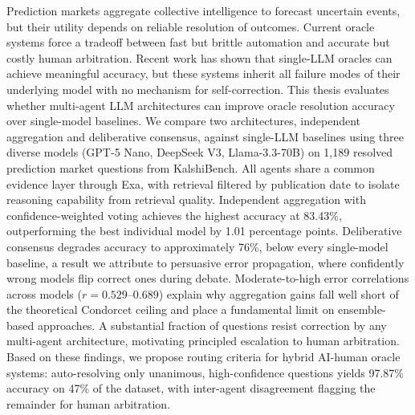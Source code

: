 \thispagestyle{plain}

Prediction markets aggregate collective intelligence to forecast uncertain events, but their utility depends on reliable resolution of outcomes. Current oracle systems force a tradeoff between fast but brittle automation and accurate but costly human arbitration. Recent work has shown that single-LLM oracles can achieve meaningful accuracy, but these systems inherit all failure modes of their underlying model with no mechanism for self-correction. This thesis evaluates whether multi-agent LLM architectures can improve oracle resolution accuracy over single-model baselines. We compare two architectures, independent aggregation and deliberative consensus, against single-LLM baselines using three diverse models (GPT-5 Nano, DeepSeek V3, Llama-3.3-70B) on 1,189 resolved prediction market questions from KalshiBench. All agents share a common evidence layer through Exa, with retrieval filtered by publication date to isolate reasoning capability from retrieval quality. Independent aggregation with confidence-weighted voting achieves the highest accuracy at 83.43\%, outperforming the best individual model by 1.01 percentage points. Deliberative consensus degrades accuracy to approximately 76\%, below every single-model baseline, a result we attribute to persuasive error propagation, where confidently wrong models flip correct ones during debate. Moderate-to-high error correlations across models ($r = 0.529$--$0.689$) explain why aggregation gains fall well short of the theoretical Condorcet ceiling and place a fundamental limit on ensemble-based approaches. A substantial fraction of questions resist correction by any multi-agent architecture, motivating principled escalation to human arbitration. Based on these findings, we propose routing criteria for hybrid AI-human oracle systems: auto-resolving only unanimous, high-confidence questions yields 97.87\% accuracy on 47\% of the dataset, with inter-agent disagreement flagging the remainder for human arbitration.
